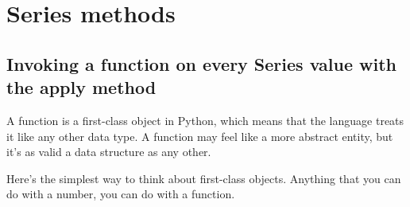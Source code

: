 \chapter{Series methods\label{Ch03}}
\section{Invoking a function on every Series value with the apply method}
A function is a first-class object in Python, which means that the language treats it like any other data type. A function may feel like a more abstract entity, but it's as valid a data structure as any other.

Here's the simplest way to think about first-class objects. Anything that you can do with a number, you can do with a function.